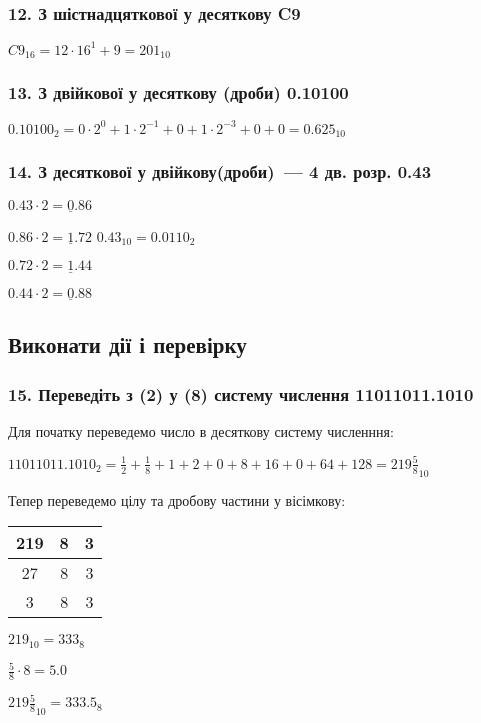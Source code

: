 \documentclass[14pt]{extreport}
\begin{document}
\subsubsection{12. З шістнадцяткової у десяткову C9 }
$C9_{16}=12\cdot16^1+9=201_{10}$

\subsubsection{13. З двійкової у десяткову (дроби) 0.10100 }
$0.10100_2=0\cdot2^0+1\cdot2^{-1}+0+1\cdot2^{-3}+0+0=0.625_{10}$
\subsubsection{14. З десяткової у двійкову(дроби)~--- 4 дв. розр. 0.43}

$0.43\cdot2=\underline{0}.86$

$0.86\cdot2=\underline{1}.72$
\hspace{.1\textwidth}
$0.43_{10}=0.0110_2$

$0.72\cdot2=\underline{1}.44$

$0.44\cdot2=\underline{0}.88$

\subsection*{Виконати дії  і перевірку }
\subsubsection{15. Переведіть з (2) у  (8)  систему числення 11011011.1010}
Для початку переведемо число в десяткову систему численння:

$11011011.1010_2=\frac{1}{2}+\frac{1}{8}+
1+2+0+8+16+0+64+128=219\frac{5}{8}_{10}$

Тепер переведемо цілу та дробову частини у вісімкову:

\bigskip
\begin{multicols}{2}
\begin{tabular}{c|c|c}
	219 & 8 & 3 \\
	\hline
	27 & 8 & 3 \\
	\hline
	3 & 8 & 3 \\
\end{tabular}

$219_{10}=333_8$

$\frac{5}{8}\cdot8=5.0$

$219\frac{5}{8}_{10}=333.5_8$

\end{multicols}
\end{document}
